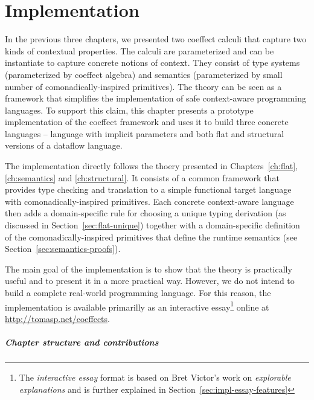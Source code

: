 
\chapter{Implementation}
\label{ch:impl}

In the previous three chapters, we presented two coeffect calculi that capture two kinds of
contextual properties. The calculi are parameterized and can be instantiate to capture concrete
notions of context. They consist of type systems (parameterized by coeffect algebra) and semantics
(parameterized by small number of comonadically-inspired primitives). The theory can be seen as
a framework that simplifies the implementation of safe context-aware programming languages. To
support this claim, this chapter presents a prototype implementation of the coeffect framework and
uses it to build three concrete languages -- language with implicit parameters and both flat and
structural versions of a dataflow language.

The implementation directly follows the thoery presented in Chapters~\ref{ch:flat}, \ref{ch:semantics}
and \ref{ch:structural}. It consists of a common framework that provides type checking and
translation to a simple functional target language with comonadically-inspired primitives. Each
concrete context-aware language then adds a domain-specific rule for choosing a unique typing
derivation (as discussed in Section~\ref{sec:flat-unique}) together with a domain-specific
definition of the comonadically-inspired primitives that define the runtime semantics
(see Section~\ref{sec:semantics-proofs}).

The main goal of the implementation is to show that the theory is practically useful and to present it
in a more practical way. However, we do not intend to build a complete real-world programming language.
For this reason, the implementation is available primarilly as an interactive essay\footnote{The
\emph{interactive essay} format is based on Bret Victor's work on \emph{explorable explanations} \cite{essay-explorable}
and is further explained in Section~\ref{sec:impl-essay-features}} online at \url{http://tomasp.net/coeffects}.

\paragraph{Chapter structure and contributions}

